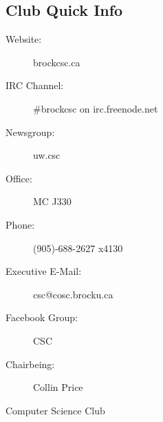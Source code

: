 \documentclass[10pt,letterpaper]{article}
\begin{document}
\begin{multicols}{3}

\section*{Club Quick Info}

\begin{description}

\item[Website:] brockcsc.ca %

\item[IRC Channel:] \#brockcsc on irc.freenode.net

\item[Newsgroup:] uw.csc

\item[Office:] MC J330

\item[Phone:] (905)-688-2627 x4130

\item[Executive E-Mail:] csc@cosc.brocku.ca

\item[Facebook Group:] CSC

\item[Chairbeing:] Collin Price


\end{description}




Computer Science Club


\end{multicols}
\end{document}
